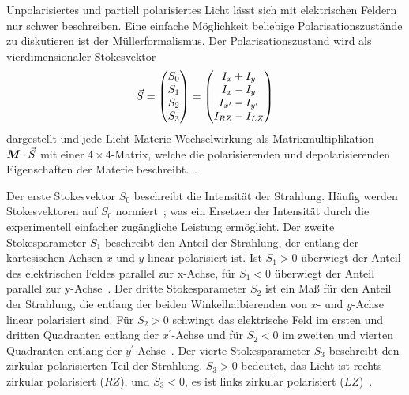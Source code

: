 \documentclass[a4paper,12pt,twoside,parskip=no,headsepline,open=right,ngerman,export]{scrreprt}
\begin{document}
            Unpolarisiertes und partiell polarisiertes Licht lässt sich mit elektrischen Feldern nur schwer beschreiben. Eine einfache Möglichkeit beliebige Polarisationszustände zu diskutieren ist der Müllerformalismus. Der Polarisationszustand wird als vierdimensionaler Stokesvektor
            \begin{equation}
                \vec{S} = \begin{pmatrix} S_0 \\ S_1 \\ S_2 \\ S_3 \end{pmatrix} = \begin{pmatrix} I_x + I_y \\ I_x - I_y \\ I_{x^\prime} - I_{y^\prime} \\ I_{RZ} - I_{LZ} \end{pmatrix}
                \label{eq:theo_stokesVek}
            \end{equation}
            dargestellt und jede Licht-Materie-Wechselwirkung als Matrixmultiplikation $\boldsymbol M\cdot\vec{S}$ mit einer $4\times 4$-Matrix, welche die polarisierenden und depolarisierenden Eigenschaften der Materie beschreibt.~\cite{gil_polarized_2016}. 
            
            Der erste Stokesvektor $S_0$ beschreibt die Intensität der Strahlung. Häufig werden Stokesvektoren auf $S_0$ normiert~\cite{gil_polarized_2016}; was ein Ersetzen der Intensität durch die experimentell einfacher zugängliche Leistung ermöglicht. Der zweite Stokesparameter $S_1$ beschreibt den Anteil der Strahlung, der entlang der kartesischen Achsen $x$ und $y$ linear polarisiert ist. Ist $S_1 > 0$ überwiegt der Anteil des elektrischen Feldes parallel zur x-Achse, für $S_1 < 0$ überwiegt der Anteil parallel zur y-Achse~\cite{gil_polarized_2016}. Der dritte Stokesparameter $S_2$ ist ein Maß für den Anteil der Strahlung, die entlang der beiden Winkelhalbierenden von $x$- und $y$-Achse linear polarisiert sind. Für $S_2 > 0$ schwingt das elektrische Feld im ersten und dritten Quadranten entlang der $x^\prime$-Achse und für $S_2 < 0$ im zweiten und vierten Quadranten entlang der $y^\prime$-Achse~\cite{gil_polarized_2016}. Der vierte Stokesparameter $S_3$ beschreibt den zirkular polarisierten Teil der Strahlung. $S_3 > 0$ bedeutet, das Licht ist rechts zirkular polarisiert ($RZ$), und $S_3 < 0$, es ist links zirkular polarisiert ($LZ$)~\cite{gil_polarized_2016}. 
            
\end{document}
